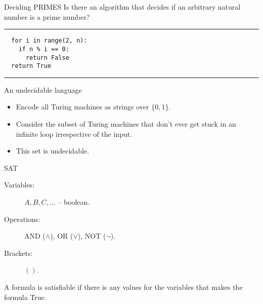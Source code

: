 \documentclass{beamer}
\begin{document}
  
  \begin{frame}[fragile]{Deciding PRIMES}
    Is there an algorithm that decides if an arbitrary natural number is a prime number?
  
  
    \vspace{8mm}
  
    \hrule
  
    \begin{verbatim}
  for i in range(2, n):
    if n % i == 0:
      return False
  return True
    \end{verbatim}
    
    \hrule
  
     \vspace{8mm}
  
  
  \end{frame}
  
  
  
  \begin{frame}{An undecidable language}
    
    \begin{itemize}
      \setlength\itemsep{6mm}
      \item Encode all Turing machines as strings over $\{0, 1\}$.
      \item Consider the subset of Turing machines that don't ever get stuck in an infinite loop irrespective of the input.
      \item This set is undecidable.
    \end{itemize}
  
  \end{frame}
  
  
  \begin{frame}{SAT}
    
  
    \vspace{6mm}
  
    \begin{description}
      \item[Variables:] $A, B, C, \ldots$ -- boolean.
      \item[Operations:] AND ($\wedge$), OR ($\lor$), NOT ($\neg$).
      \item[Brackets:] $()$. 
    \end{description}
  
    \vspace{6mm} 
  
    A formula is satisfiable if there is any values for the variables that makes the formula True.
  
    \vspace{6mm}
  
  
  \end{frame}
  
\end{document}
